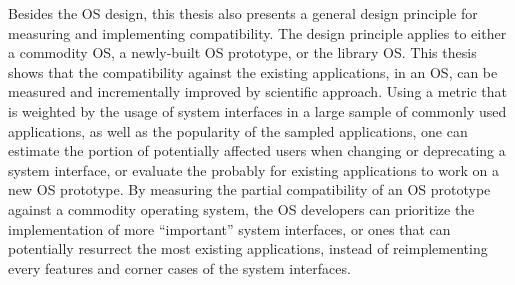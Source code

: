 





Besides the OS design, this thesis also presents a general design principle
for measuring and implementing compatibility. The design principle applies to either a commodity OS, a newly-built OS prototype, or the \graphene{} library OS.
This thesis shows that the compatibility against the existing applications, in an OS, can be measured and incrementally improved by scientific approach.
Using a metric that is weighted by the usage of system interfaces in a large sample of commonly used applications, as well as the popularity of the sampled applications, one can estimate the portion of potentially affected users when changing or deprecating a system interface, or evaluate the probably for existing applications to work on a new OS prototype. By measuring the partial compatibility of an OS prototype against a commodity operating system, the OS developers can prioritize the implementation of more ``important'' system interfaces, or ones that can potentially resurrect the most existing applications, instead of reimplementing every features and corner cases of the system interfaces.








